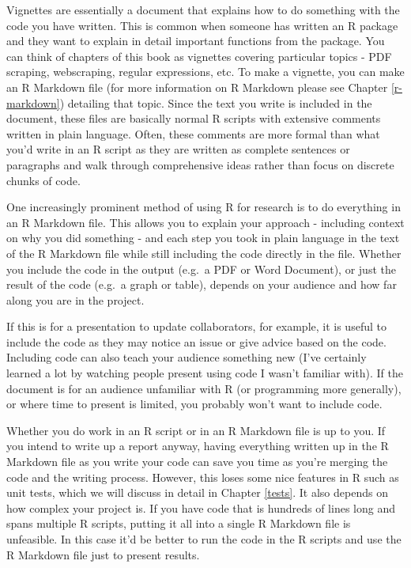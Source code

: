 \documentclass[
]{krantz}
\begin{document}
Vignettes are essentially a document that explains how to do something with the code you have written. This is common when someone has written an R package and they want to explain in detail important functions from the package. You can think of chapters of this book as vignettes covering particular topics - PDF scraping, webscraping, regular expressions, etc. To make a vignette, you can make an R Markdown file (for more information on R Markdown please see Chapter \ref{r-markdown}) detailing that topic. Since the text you write is included in the document, these files are basically normal R scripts with extensive comments written in plain language. Often, these comments are more formal than what you'd write in an R script as they are written as complete sentences or paragraphs and walk through comprehensive ideas rather than focus on discrete chunks of code.

One increasingly prominent method of using R for research is to do everything in an R Markdown file. This allows you to explain your approach - including context on why you did something - and each step you took in plain language in the text of the R Markdown file while still including the code directly in the file. Whether you include the code in the output (e.g.~a PDF or Word Document), or just the result of the code (e.g.~a graph or table), depends on your audience and how far along you are in the project.

If this is for a presentation to update collaborators, for example, it is useful to include the code as they may notice an issue or give advice based on the code. Including code can also teach your audience something new (I've certainly learned a lot by watching people present using code I wasn't familiar with). If the document is for an audience unfamiliar with R (or programming more generally), or where time to present is limited, you probably won't want to include code.

Whether you do work in an R script or in an R Markdown file is up to you. If you intend to write up a report anyway, having everything written up in the R Markdown file as you write your code can save you time as you're merging the code and the writing process. However, this loses some nice features in R such as unit tests, which we will discuss in detail in Chapter \ref{tests}. It also depends on how complex your project is. If you have code that is hundreds of lines long and spans multiple R scripts, putting it all into a single R Markdown file is unfeasible. In this case it'd be better to run the code in the R scripts and use the R Markdown file just to present results.
\end{document}
